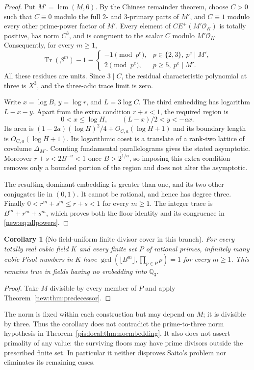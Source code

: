 \documentclass[11pt,a4paper]{article}
\newtheorem{corollary}[theorem]{Corollary}
\theoremstyle{definition}\newtheorem{definition}[theorem]{Definition}
\theoremstyle{remark}\newtheorem{remark}[theorem]{Remark}
\begin{document}
\begin{proof}
Put $M'=\operatorname{lcm}(M,6)$. By the Chinese remainder theorem,
choose $C>0$ such that $C\equiv0$ modulo the full $2$- and $3$-primary
parts of $M'$, and $C\equiv1$ modulo every other prime-power factor
of $M'$. Every element of $C E^+(M'\mathcal O_K)$ is totally positive,
has norm $C^3$, and is congruent to the scalar $C$ modulo
$M'\mathcal O_K$. Consequently, for every $m\ge1$,
\[
 \operatorname{Tr}(\beta^m)-1\equiv
 \begin{cases}
 -1\pmod{p^e},&p\in\{2,3\},\ p^e\mid M',\\
 2\pmod{p^e},&p\ge5,\ p^e\mid M'.
 \end{cases}
\]
All these residues are units. Since $3\mid C$, the residual
characteristic polynomial at three is $X^3$, and the three-adic trace
limit is zero.

Write $x=\log B$, $y=\log r$, and $L=3\log C$. The third embedding
has logarithm $L-x-y$. Apart from the extra condition $r+s<1$, the
required region is
\[
 0<x\le\log H,\qquad (L-x)/2<y<-ax.
\]
Its area is $(1-2a)(\log H)^2/4+O_{C,a}(\log H+1)$ and its boundary
length is $O_{C,a}(\log H+1)$. Its logarithmic coset is a translate
of a rank-two lattice of covolume $\Delta_{M'}$. Counting fundamental
parallelograms gives the stated asymptotic. Moreover $r+s<2B^{-a}<1$
once $B>2^{1/a}$, so imposing this extra condition removes only a
bounded portion of the region and does not alter the asymptotic.

The resulting dominant embedding is greater than one, and its two
other conjugates lie in $(0,1)$. It cannot be rational, and hence has
degree three. Finally $0<r^m+s^m\le r+s<1$ for every $m\ge1$.
The integer trace is $B^m+r^m+s^m$, which proves both the floor
identity and its congruence in \eqref{new:eq:allpowers}.
\end{proof}

\begin{corollary}[No field-uniform finite divisor cover in this branch]
For every totally real cubic field $K$ and every finite set $P$ of
rational primes, infinitely many cubic Pisot numbers in $K$ have
$\gcd(\lfloor B^m\rfloor,\prod_{p\in P}p)=1$ for every $m\ge1$.
This remains true in fields having no embedding into $\mathbb Q_3$.
\end{corollary}
\begin{proof}
Take $M$ divisible by every member of $P$ and apply
Theorem~\ref{new:thm:predecessor}.
\end{proof}
The norm is fixed within each construction but may depend on $M$;
it is divisible by three. Thus the corollary does not contradict the
prime-to-three norm hypothesis in Theorem~\ref{pis:local:thm:noembedding}.
It also does not assert primality of any value: the surviving floors
may have prime divisors outside the prescribed finite set. In
particular it neither disproves Saito's problem nor eliminates its
remaining cases.
\end{document}
